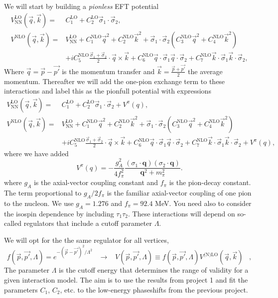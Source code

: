 \documentclass[%
oneside,                 %
final,                   %
10pt]{article}
\begin{document}
We will start by building  a \emph{pionless} EFT potential
\begin{align*}
V^\mathrm{LO}_\mathrm{NN}(\vec{q},\vec{k})=&C^\mathrm{LO}_1+C^\mathrm{LO}_2\vec{\sigma}_1\cdot\vec{\sigma}_2,\\
V^\mathrm{NLO}(\vec{q},\vec{k})=&V^\mathrm{LO}_\mathrm{NN}+C^\mathrm{NLO}_1\vec{q}^2+C^\mathrm{NLO}_2\vec{k}^2+
\vec{\sigma}_1\cdot\vec{\sigma}_2\left(C^\mathrm{NLO}_3\vec{q}^2+C^\mathrm{NLO}_4\vec{k}^2\right)\\
&+iC^\mathrm{NLO}_5\frac{\vec{\sigma}_1+\vec{\sigma}_2}{2}\cdot\vec{q}\times\vec{k}+C^\mathrm{NLO}_6\vec{q}\cdot\vec{\sigma}_1\vec{q}\cdot\vec{\sigma}_2
+C^\mathrm{NLO}_7\vec{k}\cdot\vec{\sigma}_1\vec{k}\cdot\vec{\sigma}_2,
\end{align*}
Where $\vec{q}=\vec{p}-\vec{p'}$ is the momentum transfer and $\vec{k}=\frac{\vec{p}+\vec{p'}}{2}$ the average momentum.
Thereafter we will add the one-pion exchange term to these interactions and label this
as the pionfull potential with expressions
\begin{align*}
V^\mathrm{LO}_\mathrm{NN}(\vec{q},\vec{k})=&C^\mathrm{LO}_1+C^\mathrm{LO}_2\vec{\sigma}_1\cdot\vec{\sigma}_2+V^{\pi}(q),\\
V^\mathrm{NLO}(\vec{q},\vec{k})=&V^\mathrm{LO}_\mathrm{NN}+C^\mathrm{NLO}_1\vec{q}^2+C^\mathrm{NLO}_2\vec{k}^2+
\vec{\sigma}_1\cdot\vec{\sigma}_2\left(C^\mathrm{NLO}_3\vec{q}^2+C^\mathrm{NLO}_4\vec{k}^2\right)\\
&+iC^\mathrm{NLO}_5\frac{\vec{\sigma}_1+\vec{\sigma}_2}{2}\cdot\vec{q}\times\vec{k}+C^\mathrm{NLO}_6\vec{q}\cdot\vec{\sigma}_1\vec{q}\cdot\vec{\sigma}_2
+C^\mathrm{NLO}_7\vec{k}\cdot\vec{\sigma}_1\vec{k}\cdot\vec{\sigma}_2+V^{\pi}(q),
\end{align*}
where we have added
\[
V^{\pi}(q)=-\frac{g_A^{2}}{4f_{\pi}^2}
\frac{(\sigma_{1}\cdot\mathbf{q})(\sigma_{2}\cdot\mathbf{q})}{\mathbf{q}^{2}+m_{\pi}^{2}}.
\]
where $g_A$ is the axial-vector coupling constant and $f_{\pi}$ is the pion-decay constant. The term
proportional to $g_A/2f_{\pi}$ is the familiar axial-vector coupling of one pion to the nucleon.
We use $g_A = 1.276$ and $f_{\pi}=92.4$ MeV.
You need also to consider the isospin dependence by including $\tau_{1}\tau_{2}$. These interactions will depend on so-called regulators  that include a
cutoff parameter $\Lambda$.


We will opt for the the same regulator for all vertices,
\[
f(\vec{p},\vec{p'},\Lambda)=e^{-\left(\vec{p}-\vec{p'}\right)^2/\Lambda^2}\;\;\;\rightarrow\;\;\;V(\vec{p},\vec{p'},\Lambda)\equiv f(\vec{p},\vec{p'},\Lambda)V^\text{(N)LO}(\vec{q},\vec{k})\;\;\;,
\]
The parameter $\Lambda$ is the cutoff energy that determines the range of validity for a given interaction model.
The aim is to use the results from project 1 and
fit the parameters $C_1$, $C_2$, etc. to the low-energy phaseshifts from the previous project.  
\end{document}
